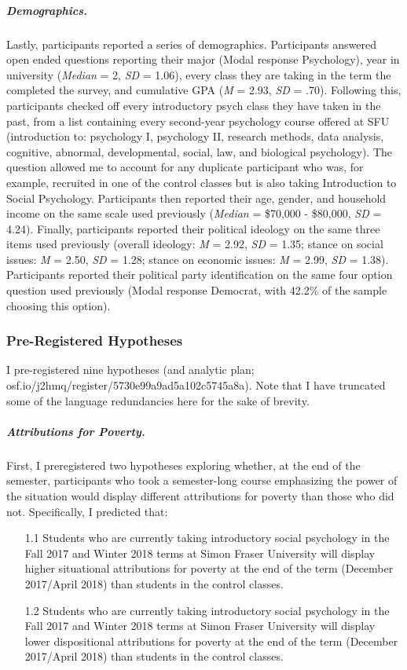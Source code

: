 \documentclass{sfuthesis}
\begin{document}
\subparagraph{Demographics.} Lastly, participants reported a series of demographics. Participants answered open ended questions reporting their major (Modal response Psychology), year in university (\textit{Median} = 2, \textit{SD} = 1.06), every class they are taking in the term the completed the survey, and cumulative GPA (\textit{M} = 2.93, \textit{SD} = .70). Following this, participants checked off every introductory psych class they have taken in the past, from a list containing every second-year psychology course offered at SFU (introduction to: psychology I, psychology II, research methods, data analysis, cognitive, abnormal, developmental, social, law, and biological psychology). The question allowed me to account for any duplicate participant who was, for example, recruited in one of the control classes but is also taking Introduction to Social Psychology. Participants then reported their age, gender, and household income on the same scale used previously (\textit{Median} = \$70,000 - \$80,000, \textit{SD} = 4.24). Finally, participants reported their political ideology on the same three items used previously (overall ideology: \textit{M} = 2.92, \textit{SD} = 1.35; stance on social issues: \textit{M} = 2.50, \textit{SD} = 1.28; stance on economic issues: \textit{M} = 2.99, \textit{SD} = 1.38). Participants reported their political party identification on the same four option question used previously (Modal response Democrat, with 42.2\% of the sample choosing this option).

\subsubsection{Pre-Registered Hypotheses}

I pre-registered nine hypotheses (and analytic plan; osf.io/j2hmq/register/5730e99a9ad5a102c5745a8a). Note that I have truncated some of the language redundancies here for the sake of brevity.

\subparagraph{Attributions for Poverty.} First, I preregistered two hypotheses exploring whether, at the end of the semester, participants who took a semester-long course emphasizing the power of the situation would display different attributions for poverty than those who did not. Specifically, I predicted that:

\begin{itemize}
  \item [1.1]	Students who are currently taking introductory social psychology in the Fall 2017 and Winter 2018 terms at Simon Fraser University will display higher situational attributions for poverty at the end of the term (December 2017/April 2018) than students in the control classes.
  \item [1.2]	Students who are currently taking introductory social psychology in the Fall 2017 and Winter 2018 terms at Simon Fraser University will display lower dispositional attributions for poverty at the end of the term (December 2017/April 2018) than students in the control classes.
\end{itemize}
\end{document}

